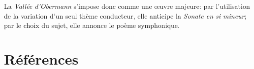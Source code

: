 \documentclass[11pt,a4paper]{scrartcl}
\begin{document}
La \emph{Vallée d'Obermann} s'impose donc comme une \oe{}uvre majeure: par l'utilisation de la variation d'un seul thème
conducteur, elle anticipe la \emph{Sonate en si mineur}; par le choix du sujet, elle annonce le poème symphonique.





\nocite{cornette} \nocite{tranchefort1987} \nocite{oxford1989} \nocite{liszt:pelerinage1,liszt:pelerinage2} 

\clearpage

\section*{Références}
\printbibliography[heading=theorie, keyword=musique, notkeyword=partition]

\printbibliography[heading=partitions, keyword=partition]

 
 \tableofcontents
 
\end{document}
